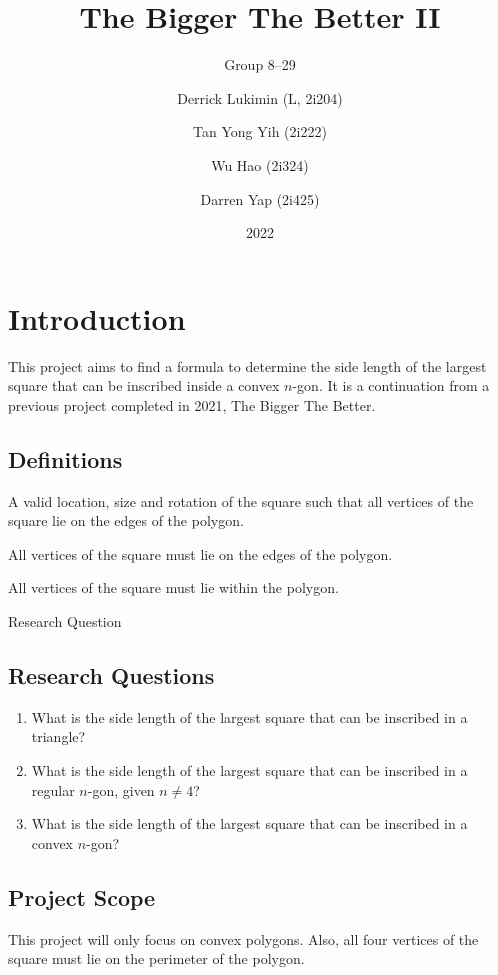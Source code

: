 \documentclass[12pt]{scrartcl}
\title{The Bigger The Better II}
\subtitle{Group 8--29}
\date{2022}
\author{
	Derrick Lukimin (L, 2i204) \and Tan Yong Yih (2i222) \and
	Wu Hao (2i324) \and Darren Yap (2i425)
}
\begin{document}
\doublespacing
\maketitle
\pagebreak
\tableofcontents
\pagebreak

\section{Introduction}
This project aims to find a formula to determine
the side length of the largest square that can be
inscribed inside a convex $n$-gon. It is a continuation from
a previous project completed in 2021, The Bigger The Better. \cite{tbtb1}

\subsection{Definitions}
\begin{description}[font=\bfseries, leftmargin=1cm, style=nextline]
	\item[placement] A valid location, size and rotation of the square such that
		all vertices of the square lie on the edges of the polygon.
	\item[inscribed] All vertices of the square must lie on the edges of the polygon.
	\item[fit] All vertices of the square must lie within the polygon.
	\item[RQ] Research Question
\end{description}

\subsection{Research Questions}
\begin{enumerate}
	\item What is the side length of the largest square that can be inscribed in a triangle?
	\item What is the side length of the largest square that can be inscribed in a regular $n$-gon, given $n \neq 4$?
	\item What is the side length of the largest square that can be inscribed in a convex $n$-gon?
\end{enumerate}

\subsection{Project Scope}
This project will only focus on convex polygons. Also, all four vertices of the square must lie on the perimeter of the polygon.
\end{document}
